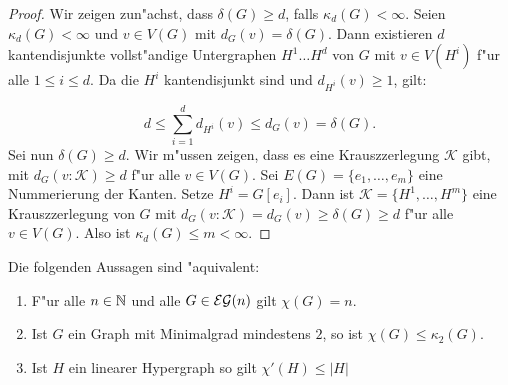 \begin{proof}
  Wir zeigen zun"achst, dass $\delta(G) \geq d$, falls $\kappa_d(G) < \infty$. Seien $\kappa_d(G) <\infty$ und $v\in V(G)$ mit $d_{G}(v) = \delta(G)$. Dann existieren $d$ kantendisjunkte vollst"andige Untergraphen $H^{1}\dots H^{d}$ von $G$ mit $v\in V(H^{i})$ f"ur alle $1\leq i \leq d$. Da die $H^{i}$ kantendisjunkt sind und $d_{H^{i}}(v)\geq1$, gilt: 

  \[
    d \leq \sum\limits_{i=1}^{d} d_{H^{i}}(v) \leq d_G(v) = \delta(G). 
  \]
  Sei nun $\delta(G) \geq d$. Wir m"ussen zeigen, dass es eine Krauszzerlegung $\mathcal{K}$ gibt, mit $d_{G}(v:\mathcal{K}) \geq d$ f"ur alle $v\in V(G)$. Sei $E(G)= \{e_1,\dots, e_{m}\}$ eine Nummerierung der Kanten. Setze $H^{i}= G[e_i]$. Dann ist $\mathcal{K} = \{H^{1},\dots, H^{m}\}$ eine Krauszzerlegung von $G$ mit $d_{G}(v:\mathcal{K}) = d_{G}(v) \geq \delta(G) \geq d$ f"ur alle $v\in V(G)$. Also ist $\kappa_d(G)\leq m <\infty$.

\end{proof}
\begin{theorem}
  Die folgenden Aussagen sind "aquivalent:
  \begin{enumerate}[label=(\alph*)]
    \item F"ur alle $n\in{\mathbb{N}}$ und alle $G\in{\cal EG}(n)$ gilt $\chi(G) = n$.
    \item Ist $G$ ein Graph mit Minimalgrad mindestens $2$, so ist $\chi(G) \leq \kappa_{2}(G)$.
    \item Ist $H$ ein linearer Hypergraph so gilt $\chi'(H)\leq |H|$
  \end{enumerate}
  \label{thm:equivefl}
\end{theorem}

